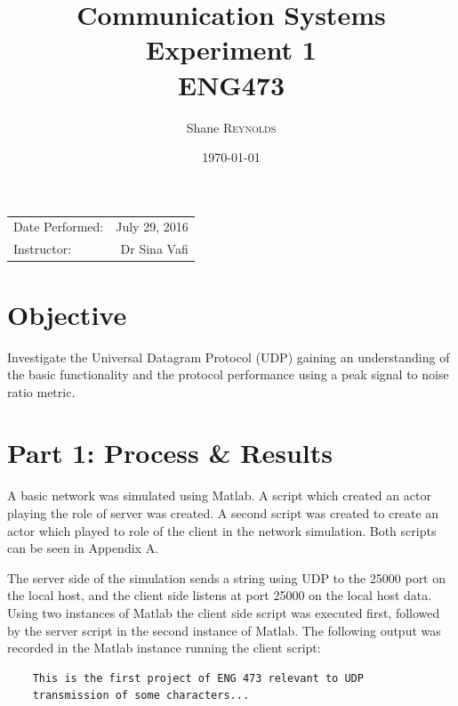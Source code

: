 \documentclass{article}
\title{Communication Systems \\ Experiment 1 \\ ENG473} %
\author{Shane \textsc{Reynolds}} %
\date{\today} %
\begin{document}
\maketitle %

\begin{center}
\begin{tabular}{l r}
Date Performed: & July 29, 2016 \\ %
Instructor: & Dr Sina Vafi %
\end{tabular}
\end{center}


\graphicspath{{./fig/}}


\section{Objective}

Investigate the Universal Datagram Protocol (UDP) gaining an understanding of the basic functionality and the protocol performance using a peak signal to noise ratio metric.


\section{Part 1: Process \& Results}

A basic network was simulated using Matlab. A script which created an actor playing the role of server was created. A second script was created to create an actor which played to role of the client in the network simulation. Both scripts can be seen in Appendix A. 

The server side of the simulation sends a string using UDP to the 25000 port on the local host, and the client side listens at port 25000 on the local host data. Using two instances of Matlab the client side script was executed first, followed by the server script in the second instance of Matlab. The following output was recorded in the Matlab instance running the client script:\\
\begin{verbatim}
	This is the first project of ENG 473 relevant to UDP 
	transmission of some characters...
\end{verbatim}
\end{document}
